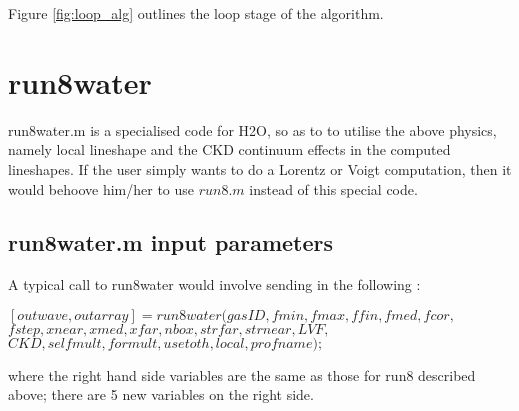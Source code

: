 \documentclass[11pt]{article}
\begin{document}
Figure \ref{fig:loop_alg} outlines the loop stage of the algorithm.

\section{run8water}

run8water.m is a specialised code for H2O, so as to to utilise the above 
physics, namely local lineshape and the CKD continuum effects in the 
computed 
lineshapes. If the user simply wants to do a Lorentz or Voigt computation,
then it would behoove him/her to use $run8.m$ instead of this special code.

\subsection{run8water.m input parameters}

A typical call to run8water would involve sending in the following : 

$[outwave,outarray]=run8water(gasID,fmin,fmax,ffin,fmed,fcor,$\\
              $fstep,xnear,xmed,xfar,nbox,strfar,strnear,LVF,$\\
              $CKD,selfmult,formult,usetoth,local,profname);$

where the right hand side variables are the same as those for run8 
described above; there are 5 new variables on the right side.
\end{document}
